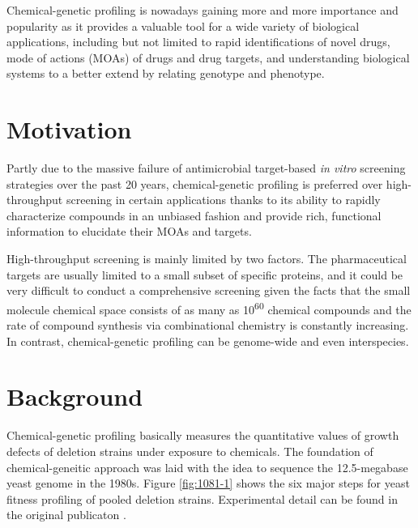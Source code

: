 \documentclass[12pt,conference,compsocconf]{../IEEEtran}
\begin{document}
Chemical-genetic profiling is nowadays gaining more and more importance and popularity as it provides a valuable tool for a wide variety of biological applications, including but not limited to rapid identifications of novel drugs, mode of actions (MOAs) of drugs and drug targets, and understanding biological systems to a better extend by relating genotype and phenotype.

\section{Motivation}

Partly due to the massive failure of antimicrobial target-based \textit{in vitro} screening strategies over the past 20 years, chemical-genetic profiling is preferred over high-throughput screening in certain applications thanks to its ability to rapidly characterize compounds in an unbiased fashion and provide rich, functional information to elucidate their MOAs and targets.

High-throughput screening is mainly limited by two factors. The pharmaceutical targets are usually limited to a small subset of specific proteins, and it could be very difficult to conduct a comprehensive screening given the facts that the small molecule chemical space consists of as many as 10\textsuperscript{60} chemical compounds and the rate of compound synthesis via combinational chemistry is constantly increasing. In contrast, chemical-genetic profiling can be genome-wide and even interspecies.

\section{Background}

Chemical-genetic profiling basically measures the quantitative values of growth defects of deletion strains under exposure to chemicals. The foundation of chemical-geneitic approach was laid with the idea to sequence the 12.5-megabase yeast genome in the 1980s. Figure \ref{fig:1081-1} shows the six major steps for yeast fitness profiling of pooled deletion strains. Experimental detail can be found in the original publicaton \citep{1081}.
\end{document}
